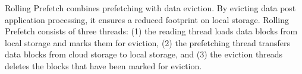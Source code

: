 \documentclass[conference]{IEEEtran}
\begin{document}

Rolling Prefetch combines prefetching with data eviction. By evicting data post application processing, it ensures a reduced footprint on local storage. Rolling Prefetch consists of three threads: (1) the reading thread loads data blocks from local storage and marks them for eviction, (2) the prefetching thread transfers data blocks from cloud storage to local storage, and (3) the eviction threads deletes the blocks that have been marked for eviction.
    
    
    
        
        
        
    
\end{document}
